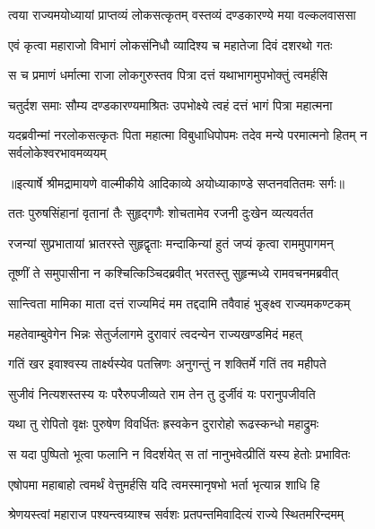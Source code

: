 \twolineshloka
{त्वया राज्यमयोध्यायां प्राप्तव्यं लोकसत्कृतम्}
{वस्तव्यं दण्डकारण्ये मया वल्कलवाससा} %

\twolineshloka
{एवं कृत्वा महाराजो विभागं लोकसंनिधौ}
{व्यादिश्य च महातेजा दिवं दशरथो गतः} %

\twolineshloka
{स च प्रमाणं धर्मात्मा राजा लोकगुरुस्तव}
{पित्रा दत्तं यथाभागमुपभोक्तुं त्वमर्हसि} %

\twolineshloka
{चतुर्दश समाः सौम्य दण्डकारण्यमाश्रितः}
{उपभोक्ष्ये त्वहं दत्तं भागं पित्रा महात्मना} %

\fourlineindentedshloka
{यदब्रवीन्मां नरलोकसत्कृतः}
{पिता महात्मा विबुधाधिपोपमः}
{तदेव मन्ये परमात्मनो हितम्}
{न सर्वलोकेश्वरभावमव्ययम्} %


{॥इत्यार्षे श्रीमद्रामायणे वाल्मीकीये आदिकाव्ये अयोध्याकाण्डे सप्तनवतितमः सर्गः॥}


\twolineshloka
{ततः पुरुषसिंहानां वृतानां तैः सुहृद्गणैः}
{शोचतामेव रजनी दुःखेन व्यत्यवर्तत} %

\twolineshloka
{रजन्यां सुप्रभातायां भ्रातरस्ते सुहृद्वृताः}
{मन्दाकिन्यां हुतं जप्यं कृत्वा राममुपागमन्} %

\twolineshloka
{तूष्णीं ते समुपासीना न कश्चित्किञ्चिदब्रवीत्}
{भरतस्तु सुहृन्मध्ये रामवचनमब्रवीत्} %

\twolineshloka
{सान्त्विता मामिका माता दत्तं राज्यमिदं मम}
{तद्ददामि तवैवाहं भुङ्क्ष्व राज्यमकण्टकम्} %

\twolineshloka
{महतेवाम्बुवेगेन भिन्नः सेतुर्जलागमे}
{दुरावारं त्वदन्येन राज्यखण्डमिदं महत्} %

\twolineshloka
{गतिं खर इवाश्वस्य तार्क्ष्यस्येव पतत्त्रिणः}
{अनुगन्तुं न शक्तिर्मे गतिं तव महीपते} %

\twolineshloka
{सुजीवं नित्यशस्तस्य यः परैरुपजीव्यते}
{राम तेन तु दुर्जीवं यः परानुपजीवति} %

\twolineshloka
{यथा तु रोपितो वृक्षः पुरुषेण विवर्धितः}
{ह्रस्वकेन दुरारोहो रूढस्कन्धो महाद्रुमः} %

\twolineshloka
{स यदा पुष्पितो भूत्वा फलानि न विदर्शयेत्}
{स तां नानुभवेत्प्रीतिं यस्य हेतोः प्रभावितः} %

\twolineshloka
{एषोपमा महाबाहो त्वमर्थं वेत्तुमर्हसि}
{यदि त्वमस्मानृषभो भर्ता भृत्यान्न शाधि हि} %

\twolineshloka
{श्रेणयस्त्वां महाराज पश्यन्त्वग्र्याश्च सर्वशः}
{प्रतपन्तमिवादित्यं राज्ये स्थितमरिन्दमम्} %

